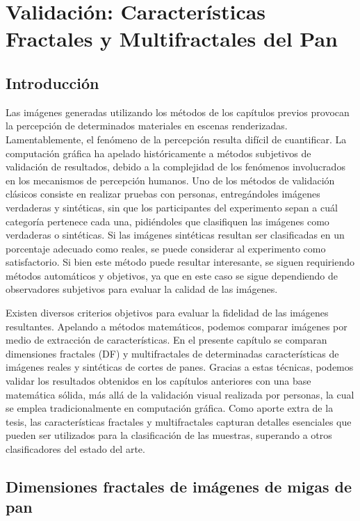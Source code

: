 \chapter[Características Fractales del Pan]{Validación: Características Fractales y Multifractales del Pan}

\section{Introducción}
Las imágenes generadas utilizando los métodos de los capítulos previos provocan la percepción de determinados materiales en escenas renderizadas.
Lamentablemente, el fenómeno de la percepción resulta difícil de cuantificar.
La computación gráfica ha apelado históricamente a métodos subjetivos de validación de resultados, debido a la complejidad de los fenómenos involucrados en los mecanismos de percepción humanos.
Uno de los métodos de validación clásicos consiste en realizar pruebas con personas, entreg\'andoles im\'agenes verdaderas y sint\'eticas, sin que los participantes del experimento sepan a cu\'al categor\'ia pertenece cada una, pidi\'endoles que clasifiquen las im\'agenes como verdaderas o sint\'eticas.
Si las im\'agenes sint\'eticas resultan ser clasificadas en un porcentaje adecuado como reales, se puede considerar al experimento como satisfactorio.
Si bien este método puede resultar interesante, se siguen requiriendo métodos automáticos y objetivos, ya que en este caso se sigue dependiendo de observadores subjetivos para evaluar la calidad de las imágenes.


Existen diversos criterios objetivos para evaluar la fidelidad de las im\'agenes resultantes.
Apelando a métodos matemáticos, podemos comparar imágenes por medio de extracci\'on de caracter\'isticas.
En el presente capítulo se comparan dimensiones fractales (\acrshort{DF}) y multifractales de determinadas caracter\'isticas de imágenes reales y sint\'eticas de cortes de panes.
Gracias a estas t\'ecnicas, podemos validar los resultados obtenidos en los cap\'itulos anteriores con una base matem\'atica s\'olida, m\'as all\'a de la validaci\'on visual realizada por personas, la cual se emplea tradicionalmente en computaci\'on gr\'afica.
Como aporte extra de la tesis, las características fractales y multifractales capturan detalles esenciales que pueden ser utilizados para la clasificación de las muestras, superando a otros clasificadores del estado del arte.


\section{Dimensiones fractales de imágenes de migas de pan}

